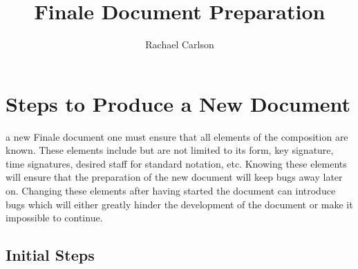 \documentclass[unicode,hyperfootnotes=false,xetex,colorlinks=true,nofonts,nobib]{tufte-handout} %
\title{Finale Document Preparation}
\author{Rachael Carlson}
\begin{document}
\maketitle

\section{Steps to Produce a New Document}
\label{sec:steps-produce-new}

 a new Finale document one must ensure that all
elements of the composition are known. These elements include but are
not limited to its form, key signature, time signatures, desired staff
for standard notation, etc. Knowing these elements will ensure that
the preparation of the new document will keep bugs away later
on. Changing these elements after having started the document can
introduce bugs which will either greatly hinder the development of the
document or make it impossible to continue.

\subsection{Initial Steps}
\label{sec:initial-steps}
\end{document}
